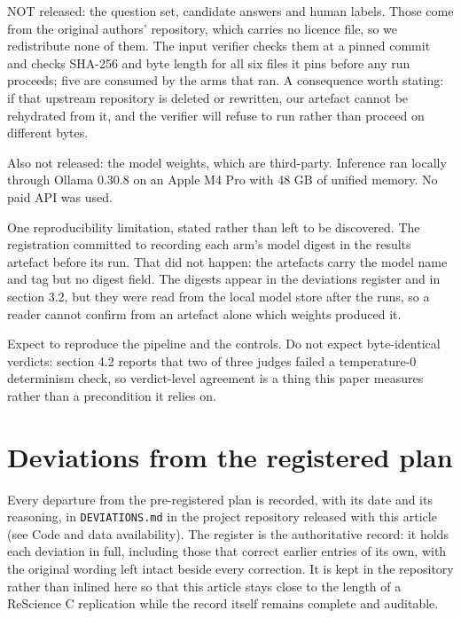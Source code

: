 NOT released: the question set, candidate answers and human labels. Those come from the original
authors' repository, which carries no licence file, so we redistribute none of them. The input verifier checks them at a pinned commit and checks SHA-256 and byte length for all six files it
pins before any run proceeds; five are consumed by the arms that ran. A consequence worth stating:
if that upstream repository is deleted or rewritten, our artefact cannot be rehydrated from it, and
the verifier will refuse to run rather than proceed on different bytes.

Also not released: the model weights, which are third-party. Inference ran locally through Ollama
0.30.8 on an Apple M4 Pro with 48 GB of unified memory. No paid API was used.

One reproducibility limitation, stated rather than left to be discovered. The registration
committed to recording each arm's model digest in the results artefact before its run. That did not
happen: the artefacts carry the model name and tag but no digest field. The digests appear in
the deviations register and in section 3.2, but they were read from the local model store after the runs, so a
reader cannot confirm from an artefact alone which weights produced it.

Expect to reproduce the pipeline and the controls. Do not expect byte-identical verdicts: section
4.2 reports that two of three judges failed a temperature-0 determinism check, so verdict-level
agreement is a thing this paper measures rather than a precondition it relies on.

\section{Deviations from the registered plan}\label{deviations-from-the-registered-plan}

Every departure from the pre-registered plan is recorded, with its date and its
reasoning, in \texttt{DEVIATIONS.md} in the project repository released with this article
(see Code and data availability). The register is the authoritative record: it
holds each deviation in full, including those that correct earlier entries of its
own, with the original wording left intact beside every correction. It is kept in
the repository rather than inlined here so that this article stays close to the
length of a ReScience C replication while the record itself remains complete and
auditable.
